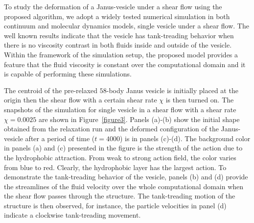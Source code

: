 \documentclass[lineno]{jfm}
\begin{document}
To study the deformation of a Janus-vesicle under a shear flow using the proposed algorithm, 
we adopt a widely tested numerical simulation in both continuum and molecular dynamics models, single vesicle under a shear flow. The well known results indicate that the vesicle has tank-treading behavior when 
there is no viscosity contrast in both fluids inside and outside of the vesicle. Within the framework of the simulation setup, the proposed model provides a feature that the fluid viscosity is constant over the computational domain and it is capable of performing these simulations.

The centroid of the pre-relaxed $58$-body Janus vesicle is initially placed at the origin then the shear flow 
with a certain shear rate $\chi$ is then turned on. 
The snapshots of the simulation for single vesicle in a shear flow with a shear rate $\chi=0.0025$ are shown 
in Figure~\ref{figure3}.
Panels (a)-(b) show the initial shape obtained from the relaxation run and the deformed 
configuration of the Janus-vesicle after a period of time ($t=4000$) is in panels (c)-(d). 
The background color in panels (a) and (c) presented in the figure is the strength of the action due to the
hydrophobic attraction. From weak to strong action field, the color varies from blue to red. Clearly, the
hydrophobic layer has the largest action. To demonstrate the tank-treading behavior of the vesicle, panels (b) 
and (d) provide the streamlines of the fluid velocity over the whole computational domain when the shear 
flow passes through the structure. The tank-treading motion of the structure is then observed, for instance,
the particle velocities in panel (d) indicate a clockwise tank-treading movement.
\end{document}
